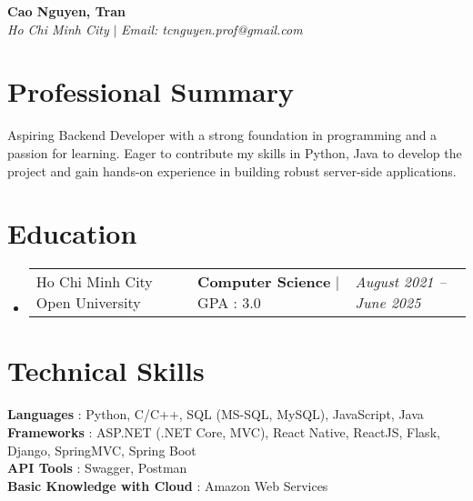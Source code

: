 \documentclass[letterpaper,12pt]{article}
\makeatletter
\newcommand{\sectionspace}{
\vspace{-10pt}
}
\newcommand{\subheadingtitlevspace}{
\vspace{-3pt}
}
\newcommand{\titleItem}[1]{
  \textbf{#1}
}
\newcommand{\resumeSubheading}[4]{
  \item
     \begin{tabular*}{0.97\textwidth}[t]{l@{\extracolsep{\fill}}l@{}l}     
      {#1} & \titleItem{#3} | {#2} & \textit{#4}\\
    \end{tabular*}\vspace{-10pt}
}
\newcommand{\resumeSubHeadingListStart}{\subheadingtitlevspace\begin{itemize}[leftmargin=0.15in, label={}]}
\newcommand{\resumeSubHeadingListEnd}{\end{itemize}}
\makeatother
\begin{document}

\begin{flushleft}
  \textbf{\large Cao Nguyen, Tran} \\
  \textit{Ho Chi Minh City} $|$
  \textit{Email: tcnguyen.prof@gmail.com}

\end{flushleft}


\section{Professional Summary}
\begin{itemize}[leftmargin=0.15in, label={}]
  {\item{
        {Aspiring Backend Developer with a strong foundation in programming and a passion for
            learning. Eager to contribute my skills in Python, Java to develop the project and gain
            hands-on experience in building robust server-side applications.} \\
        }}
\end{itemize}
\sectionspace

\section{Education}
\resumeSubHeadingListStart
\resumeSubheading
{Ho Chi Minh City Open University}{GPA : 3.0}
{Computer Science}{August 2021 -- June 2025}
\resumeSubHeadingListEnd
\vspace{5pt}


\section{Technical Skills}
\subheadingtitlevspace
\begin{itemize}[leftmargin=0.15in, label={}]
  {\item{
        \titleItem{Languages}{: Python, C/C++, SQL (MS-SQL, MySQL), JavaScript, Java} \\
        \titleItem{Frameworks}{: ASP.NET (.NET Core, MVC), React Native, ReactJS, Flask, Django,  SpringMVC, Spring Boot} \\
        \titleItem{API Tools}{: Swagger, Postman} \\
        \titleItem{Basic Knowledge with Cloud}{: Amazon Web Services} \\
        }}
\end{itemize}
\sectionspace
\end{document}
